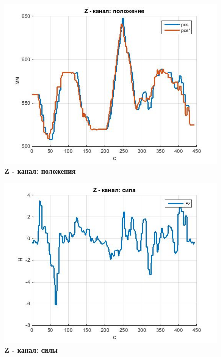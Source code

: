 \documentclass[a4paper,14pt,russian]{extreport} \usepackage{extsizes}
\begin{document}
		\begin{figure}[h]
			\centering		 
			\includegraphics[width=5.5in]{./graph/posZ.jpg}	
			\caption{
				\textbf{Z - канал: положения}
			}
			\label{fig_img45}
		\end{figure}
		\begin{figure}[h]
			\centering		 
			\includegraphics[width=5.5in]{./graph/powZ.jpg}	
			\caption{
				\textbf{Z - канал: силы}
			}
			\label{fig_img46}
		\end{figure}
\end{document}
